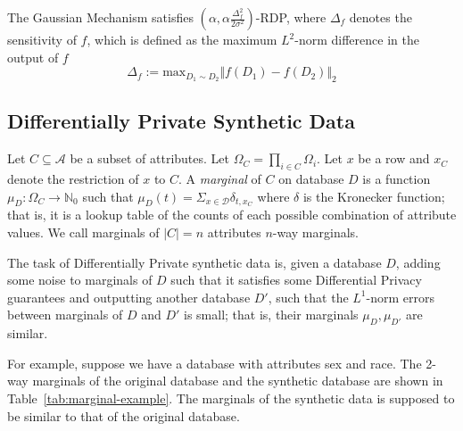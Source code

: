 \documentclass[manuscript,screen,review,anonymous]{acmart}
\renewcommand{\implies}{\rightarrow}
\newcommand{\db}{D}
\begin{document}
\begin{theorem}
The Gaussian Mechanism satisfies $(\alpha, \alpha \frac{\Delta^2_f}{2 \sigma^2})$-RDP, where $\Delta_f$ denotes the sensitivity\cite{dwork2014algorithmic} of $f$, which is defined as the maximum $L^2$-norm difference in the output of $f$
\[
\Delta_f := \text{max}_{\db_1 \sim \db_2} \Vert f(\db_1) - f(\db_2) \Vert_2
\]
\end{theorem}

\subsection{Differentially Private Synthetic Data}

Let $C \subseteq \mathcal{A}$ be a subset of attributes. Let $\Omega_C = \prod_{i \in C} \Omega_i$. Let $x$ be a row and $x_C$ denote the restriction of $x$ to $C$. A \emph{marginal}\cite{barak2007privacy,mckenna2021winning} of $C$ on database $\db$ is a function $\mu_{\db} : \Omega_C \implies \mathbb{N}_0$ such that $\mu_{\db}(t) = \Sigma_{x \in \mathcal{\db}} \delta_{t,{x_C}}$ where $\delta$ is the Kronecker function; that is, it is a lookup table of the counts of each possible combination of attribute values. We call marginals of $|C| = n$ attributes $n$-way marginals.

The task of Differentially Private synthetic data\cite{Ullman2022,McKenna2022,NIST_Differentially_Private_Synthetic_Data,YouTube_Differentially_Private_Synthetic_Data} is, given a database $\db$, adding some noise to marginals of $\db$ such that it satisfies some Differential Privacy guarantees and outputting another database $\db'$, such that the $L^1$-norm errors between marginals of $\db$ and $\db'$ is small; that is, their marginals $\mu_{\db},\mu_{\db'}$ are similar.

For example, suppose we have a database with attributes sex and race. The 2-way marginals of the original database and the synthetic database are shown in Table~\ref{tab:marginal-example}. The marginals of the synthetic data is supposed to be similar to that of the original database.
\end{document}
